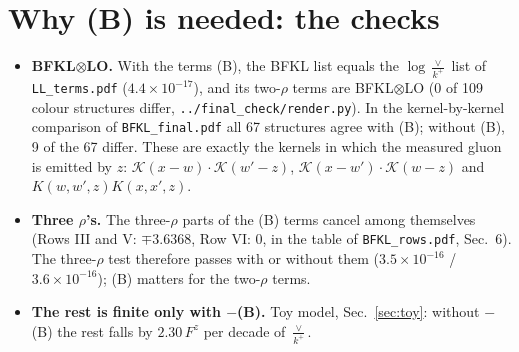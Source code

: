 \documentclass[10pt]{article}
\numberwithin{equation}{section}
\begin{document}
\section{Why (B) is needed: the checks}\label{sec:checks}
\begin{itemize}
\item \textbf{BFKL$\otimes$LO.} With the terms (B), the BFKL list equals the $\log\frac{\vee}{k^+}$ list of \texttt{LL\_terms.pdf} ($4.4\times10^{-17}$), and its two-$\rho$ terms are BFKL$\otimes$LO (0 of 109 colour structures differ, \texttt{../final\_check/render.py}). In the kernel-by-kernel comparison of \texttt{BFKL\_final.pdf} all 67 structures agree with (B); without (B), 9 of the 67 differ. These are exactly the kernels in which the measured gluon is emitted by $z$: $\mathcal K(x-w)\cdot\mathcal K(w'-z)$, $\mathcal K(x-w')\cdot\mathcal K(w-z)$ and $K(w,w',z)K(x,x',z)$.
\item \textbf{Three $\rho$'s.} The three-$\rho$ parts of the (B) terms cancel among themselves (Rows III and V: $\mp3.6368$, Row VI: $0$, in the table of \texttt{BFKL\_rows.pdf}, Sec.~6). The three-$\rho$ test therefore passes with or without them ($3.5\times10^{-16}$ / $3.6\times10^{-16}$); (B) matters for the two-$\rho$ terms.
\item \textbf{The rest is finite only with $-$(B).} Toy model, Sec.~\ref{sec:toy}: without $-$(B) the rest falls by $2.30\,F^z$ per decade of $\frac{\vee}{k^+}$.
\end{itemize}
\end{document}

